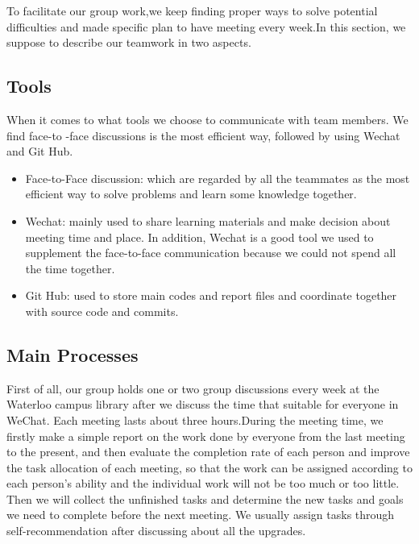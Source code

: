 \noindent To facilitate our group work,we keep finding proper ways to solve potential difficulties and made specific plan to have meeting every week.In this section, we suppose to describe our teamwork in two aspects.

\subsection{Tools}
\noindent When it comes to what tools we choose to communicate with team members. We find face-to -face discussions is the most efficient way, followed by using Wechat and Git Hub.
\begin{itemize}
    \item Face-to-Face discussion: which are regarded by all the teammates as the most efficient way to solve problems and learn some knowledge together.
    \item Wechat: mainly used to share learning materials and make decision about meeting time and place. In addition, Wechat is a good tool we used to supplement the face-to-face communication because we could not spend all the time together.
    \item Git Hub: used to store main codes and report files and coordinate together with source code and commits.
\end{itemize}
\vspace{0.2cm}

\subsection{Main Processes}

\noindent First of all, our group holds one or two group discussions every week at the Waterloo campus library after we discuss the time that suitable for everyone in WeChat. Each meeting lasts about three hours.During the meeting time, we firstly make a simple report on the work done by everyone from the last meeting to the present, and then evaluate the completion rate of each person and improve the task allocation of each meeting, so that the work can be assigned according to each person's ability and the individual work will not be too much or too little. Then we will collect the unfinished tasks and determine the new tasks and goals we need to complete before the next meeting. We usually assign tasks through self-recommendation after discussing about all the upgrades.
 
